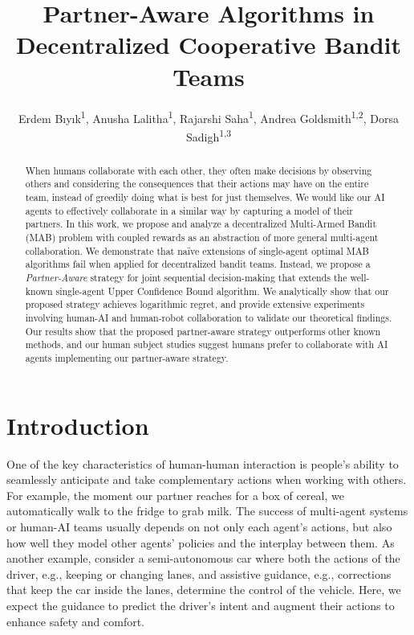 \documentclass[letterpaper]{article} %
\title{Partner-Aware Algorithms in Decentralized Cooperative Bandit Teams}
\author {
    Erdem B\i y\i k\textsuperscript{\rm 1},
    Anusha Lalitha\textsuperscript{\rm 1},
    Rajarshi Saha\textsuperscript{\rm 1},
    Andrea Goldsmith\textsuperscript{\rm 1,2},
    Dorsa Sadigh\textsuperscript{\rm 1,3}\\
}
\theoremstyle{definition}
\begin{document}
\maketitle

\begin{abstract}
When humans collaborate with each other, they often make decisions by observing others and considering the consequences that their actions may have on the entire team, instead of greedily doing what is best for just themselves. We would like our AI agents to effectively collaborate in a similar way by capturing a model of their partners. In this work, we propose and analyze a decentralized Multi-Armed Bandit (MAB) problem with coupled rewards as an abstraction of more general multi-agent collaboration. We demonstrate that na\"ive extensions of single-agent optimal MAB algorithms fail when applied for decentralized bandit teams. Instead, we propose a \emph{Partner-Aware} strategy for joint sequential decision-making that extends the well-known single-agent Upper Confidence Bound algorithm. We analytically show that our proposed strategy achieves logarithmic regret, and provide extensive experiments involving human-AI and human-robot collaboration to validate our theoretical findings. Our results show that the proposed partner-aware strategy outperforms other known methods, and our human subject studies suggest humans prefer to collaborate with AI agents implementing our partner-aware strategy.
\end{abstract}

\section{Introduction}
\label{sec:intro}
One of the key characteristics of human-human interaction is people's ability to seamlessly anticipate and take complementary actions when working with others.
For example, the moment our partner reaches for a box of cereal, we automatically walk to the fridge to grab milk.
The success of multi-agent systems or human-AI teams usually depends on not only each agent's actions, but also how well they model other agents' policies and the interplay between them.
As another example, consider a semi-autonomous car where both the actions of the driver, e.g., keeping or changing lanes, and assistive guidance, e.g., corrections that keep the car inside the lanes, determine the control of the vehicle. Here, we expect the guidance to predict the driver's intent and augment their actions to enhance safety and comfort. 
\end{document}
